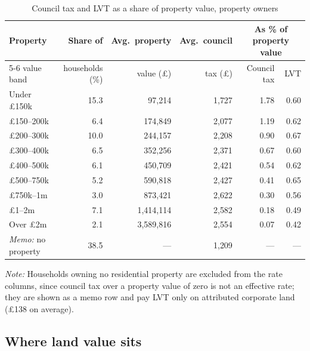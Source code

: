 \begin{table}[htbp]
\centering
\caption{Council tax and LVT as a share of property value, property owners}
\label{tab:etr}
\footnotesize
\setlength{\tabcolsep}{4pt}
\begin{tabular}{lrrrrr}
\toprule
Property & Share of & Avg.\ property & Avg.\ council & \multicolumn{2}{c}{As \% of property value} \\
\cmidrule(lr){5-6}
value band & households (\%) & value (\pounds) & tax (\pounds) & Council tax & LVT \\
\midrule
Under \pounds 150k    & 15.3 & 97{,}214    & 1{,}727 & 1.78 & 0.60 \\
\pounds 150--200k     & 6.4  & 174{,}849   & 2{,}077 & 1.19 & 0.62 \\
\pounds 200--300k     & 10.0 & 244{,}157   & 2{,}208 & 0.90 & 0.67 \\
\pounds 300--400k     & 6.5  & 352{,}256   & 2{,}371 & 0.67 & 0.60 \\
\pounds 400--500k     & 6.1  & 450{,}709   & 2{,}421 & 0.54 & 0.62 \\
\pounds 500--750k     & 5.2  & 590{,}818   & 2{,}427 & 0.41 & 0.65 \\
\pounds 750k--1m      & 3.0  & 873{,}421   & 2{,}622 & 0.30 & 0.56 \\
\pounds 1--2m         & 7.1  & 1{,}414{,}114 & 2{,}582 & 0.18 & 0.49 \\
Over \pounds 2m       & 2.1  & 3{,}589{,}816 & 2{,}554 & 0.07 & 0.42 \\
\midrule
\emph{Memo:} no property & 38.5 & --- & 1{,}209 & --- & --- \\
\bottomrule
\end{tabular}

\medskip
{\footnotesize\emph{Note:} Households owning no residential property are excluded from the rate columns, since council tax over a property value of zero is not an effective rate; they are shown as a memo row and pay LVT only on attributed corporate land (\pounds 138 on average).}
\end{table}

\subsection{Where land value sits}
\label{sec:whereland}

